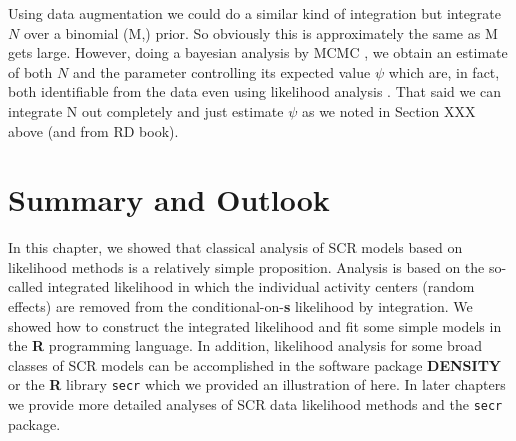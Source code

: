 Using data augmentation we could do a similar kind of integration but 
integrate $N$ over a binomial (M,\psi) prior. So obviously this is
approximately the same as M gets large. However, doing a bayesian
analysis by MCMC ,  we obtain an
estimate of both $N$ and the parameter controlling its expected value
$\psi$ which are, in fact, both identifiable from the data even using
likelihood analysis \citep{royle_etal:2007}.   That said we can integrate N
out completely and just estimate $\psi$ as we noted in Section XXX
above (and from RD book). 






\begin{comment}
\subsection{Analysis of Efford's Possum Data}

Demonstrates an explicit model misspecification.
Or maybe -- likelihood easy to apply to multinomial likelihood from
previous chapter which is probably what secr does (checking with efford)

Use the mask he provides (show picture)
Use rectangular mask.

Cite above material on state-space grid. Use our likelihood function
with his state-space grid.

Need to focus on a specific illustration here. I think using
secr to fit the basic model using the state-space grid or no
state-space
grid, and using our likelihood function, would be fine.
Thats 4 estimates. 

Secr + grid
secr + no grid -- really a fine grid I think 
my likelihood + secr grid
my likelihood + really fine grid

Note: should not compare AIC across analysis platforms because the
likelihoods can be scaled arbitrarily -- depending on what to leave in
or leave out.
\end{comment}


\section{Summary and Outlook}

In this chapter, we showed that classical analysis of SCR models based
on likelihood methods is a relatively simple proposition.  Analysis is
based on the so-called integrated likelihood in which the individual
activity centers (random effects) are removed from the
conditional-on-{\bf s} likelihood by integration. We showed how to construct
the integrated likelihood and fit some simple models in the {\bf R}
programming language.  In addition, likelihood analysis for some broad
classes of SCR models can be accomplished in the software package
{\bf DENSITY} 
or the {\bf R}
library \mbox{\tt secr} which we provided an illustration of here. In later
chapters we provide more detailed analyses of SCR data likelihood
methods and the
\mbox{\tt secr}
package.

